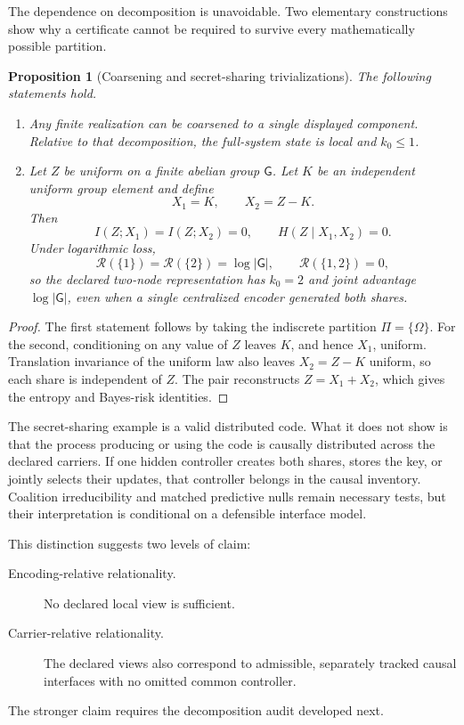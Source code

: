 \documentclass[11pt,letterpaper]{article}
\newcommand{\Risk}{\mathcal R}
\theoremstyle{plain}
\newtheorem{proposition}[theorem]{Proposition}
\theoremstyle{definition}
\begin{document}
The dependence on decomposition is unavoidable. Two elementary constructions
show why a certificate cannot be required to survive every mathematically
possible partition.

\begin{proposition}[Coarsening and secret-sharing trivializations]
\label{prop:decomposition-trivialization}
The following statements hold.
\begin{enumerate}
\item Any finite realization can be coarsened to a single displayed component.
 Relative to that decomposition, the full-system state is local and
 \(k_0\leq1\).
\item Let \(Z\) be uniform on a finite abelian group \(\mathsf G\). Let
 \(K\) be an independent uniform group element and define
 \[
 X_1=K,
 \qquad
 X_2=Z-K.
 \]
 Then
 \[
 I(Z;X_1)=I(Z;X_2)=0,
 \qquad
 H(Z\mid X_1,X_2)=0.
 \]
 Under logarithmic loss,
 \[
 \Risk(\{1\})=\Risk(\{2\})=\log|\mathsf G|,
 \qquad
 \Risk(\{1,2\})=0,
 \]
 so the declared two-node representation has \(k_0=2\) and joint advantage
 \(\log|\mathsf G|\), even when a single centralized encoder generated both
 shares.
\end{enumerate}
\end{proposition}

\begin{proof}
The first statement follows by taking the indiscrete partition
\(\Pi=\{\Omega\}\). For the second, conditioning on any value of \(Z\) leaves
\(K\), and hence \(X_1\), uniform. Translation invariance of the uniform law
also leaves \(X_2=Z-K\) uniform, so each share is independent of \(Z\). The
pair reconstructs \(Z=X_1+X_2\), which gives the entropy and Bayes-risk
identities.
\end{proof}

The secret-sharing example is a valid distributed code. What it does not show
is that the process producing or using the code is causally distributed across
the declared carriers. If one hidden controller creates both shares, stores
the key, or jointly selects their updates, that controller belongs in the
causal inventory. Coalition irreducibility and matched predictive nulls remain
necessary tests, but their interpretation is conditional on a defensible
interface model.

This distinction suggests two levels of claim:
\begin{description}
\item[Encoding-relative relationality.] No declared local view is sufficient.
\item[Carrier-relative relationality.] The declared views also correspond to
admissible, separately tracked causal interfaces with no omitted common
controller.
\end{description}
The stronger claim requires the decomposition audit developed next.
\end{document}
